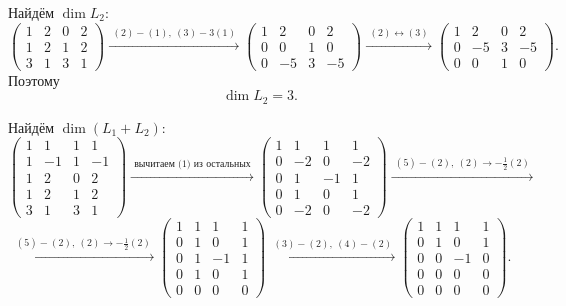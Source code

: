 \begin{enumerate}
Найдём $\dim L_2$:
\[
    \begin{pmatrix}
        1 & 2 & 0 & 2 \\
        1 & 2 & 1 & 2 \\
        3 & 1 & 3 & 1
    \end{pmatrix}
    \xrightarrow{\,\, (2)-(1),\ (3)-3(1) \,\,}
    \begin{pmatrix}
        1 & 2 & 0 & 2 \\
        0 & 0 & 1 & 0 \\
        0 & -5 & 3 & -5
    \end{pmatrix}
    \xrightarrow{\,\, (2)\leftrightarrow(3) \,\,}
    \begin{pmatrix}
        1 & 2 & 0 & 2 \\
        0 & -5 & 3 & -5 \\
        0 & 0 & 1 & 0
    \end{pmatrix}.
\]
Поэтому
\[
\dim L_2 = 3.
\]

Найдём $\dim(L_1+L_2)$:
\[
    \begin{pmatrix}
        1 & 1 & 1 & 1 \\
        1 & -1 & 1 & -1 \\
        1 & 2 & 0 & 2 \\
        1 & 2 & 1 & 2 \\
        3 & 1 & 3 & 1
    \end{pmatrix}
    \xrightarrow{\,\, \text{вычитаем (1) из остальных} \,\,}
    \begin{pmatrix}
        1 & 1 & 1 & 1 \\
        0 & -2 & 0 & -2 \\
        0 & 1 & -1 & 1 \\
        0 & 1 & 0 & 1 \\
        0 & -2 & 0 & -2
    \end{pmatrix}
    \xrightarrow{\,\, (5)-(2),\ (2)\to -\tfrac12(2) \,\,}
\] 
\[
    \xrightarrow{\,\, (5)-(2),\ (2)\to -\tfrac12(2) \,\,}
    \begin{pmatrix}
        1 & 1 & 1 & 1 \\
        0 & 1 & 0 & 1 \\
        0 & 1 & -1 & 1 \\
        0 & 1 & 0 & 1 \\
        0 & 0 & 0 & 0
    \end{pmatrix}
    \xrightarrow{\,\, (3)-(2),\ (4)-(2) \,\,}
    \begin{pmatrix}
        1 & 1 & 1 & 1 \\
        0 & 1 & 0 & 1 \\
        0 & 0 & -1 & 0 \\
        0 & 0 & 0 & 0 \\
        0 & 0 & 0 & 0
    \end{pmatrix}.
\]


\end{enumerate}
